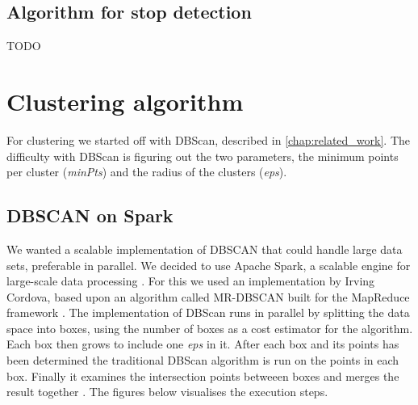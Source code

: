 \subsection{Algorithm for stop detection}

TODO

\section{Clustering algorithm}

For clustering we started off with DBScan, described in \autoref{chap:related_work}. The difficulty with DBScan is figuring out the two parameters, the minimum points per cluster (\textit{minPts}) and the radius of the clusters (\textit{eps}). 

\subsection{DBSCAN on Spark}

We wanted a scalable implementation of DBSCAN that could handle large data sets, preferable in parallel. We decided to use Apache Spark, a scalable engine for large-scale data processing \cite{spark}. For this we used an implementation by Irving Cordova, based upon an algorithm called MR-DBSCAN built for the MapReduce framework \cite{dbscan_on_spark}. The implementation of DBScan runs in parallel by splitting the data space into boxes, using the number of boxes as a cost estimator for the algorithm. Each box then grows to include one \textit{eps} in it. After each box and its points has been determined the traditional DBScan algorithm is run on the points in each box. Finally it examines the intersection points betweeen boxes and merges the result together \cite{vis_dbscan_on_spark}. The figures below visualises the execution steps.

